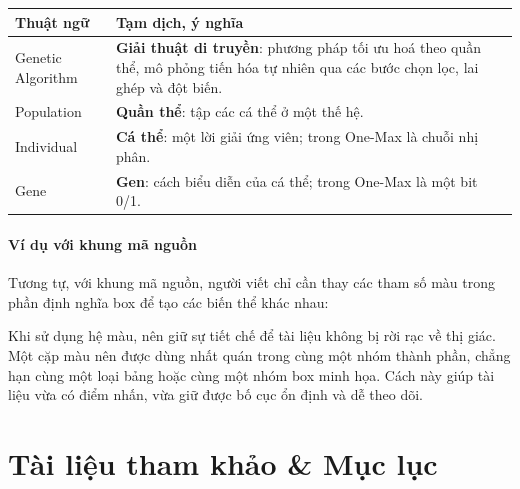 \documentclass[12pt]{eDA_conquer2026}
\begin{document}
\begin{tcolorbox}[
  colframe=aivnGreen,
  colbacktitle=aivnGreen,
  colback=white,
  boxrule=1pt,
  title=\textbf{Bảng thuật ngữ (aivnGreen \& green!12!white)},
  fonttitle=\bfseries\color{white},
  halign title=center,
  arc=5pt
]
\renewcommand{\arraystretch}{1.5}
\renewcommand{\tabularxcolumn}[1]{m{#1}}
\begin{tabularx}{\linewidth}{>{\centering\arraybackslash}m{3.0cm} X}
  \textbf{Thuật ngữ} & \textbf{Tạm dịch, ý nghĩa} \\
  \midrule
  Genetic Algorithm & \textbf{Giải thuật di truyền}: phương pháp tối ưu hoá theo quần thể, mô phỏng tiến hóa tự nhiên qua các bước chọn lọc, lai ghép và đột biến. \\
  Population & \textbf{Quần thể}: tập các cá thể ở một thế hệ. \\
  Individual & \textbf{Cá thể}: một lời giải ứng viên; trong One-Max là chuỗi nhị phân. \\
  Gene & \textbf{Gen}: cách biểu diễn của cá thể; trong One-Max là một bit 0/1. \\
\end{tabularx}
\end{tcolorbox}

\paragraph{Ví dụ với khung mã nguồn}

Tương tự, với khung mã nguồn, người viết chỉ cần thay các tham số màu trong phần định nghĩa box để tạo các biến thể khác nhau:


Khi sử dụng hệ màu, nên giữ sự tiết chế để tài liệu không bị rời rạc về thị giác. Một cặp màu nên được dùng nhất quán trong cùng một nhóm thành phần, chẳng hạn cùng một loại bảng hoặc cùng một nhóm box minh họa. Cách này giúp tài liệu vừa có điểm nhấn, vừa giữ được bố cục ổn định và dễ theo dõi.

\newpage
\section{Tài liệu tham khảo \& Mục lục}
\end{document}
